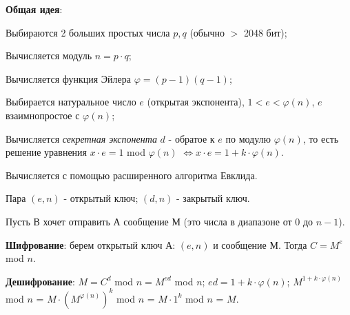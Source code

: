 \documentclass[../main.tex]{subfiles}
\begin{document}
    \textbf{Общая идея}:

    \void{} Выбираются 2 больших простых числа $p, q$ (обычно $>$ 2048 бит);

    \void{} Вычисляется модуль $n = p\cdot q$;

    \void{} Вычисляется функция Эйлера $\varphi = (p-1)(q-1)$;

    \void{} Выбирается натуральное число $e$ (открытая экспонента), $1 < e < \varphi(n)$,
    $e$ взаимнопростое с $\varphi(n)$;

    \void{} Вычисляется \textit{секретная экспонента} $d$ - обратое к $e$ по модулю $\varphi(n)$,
    то есть решение уравнения $x\cdot e = 1$ mod $\varphi(n)$ $\Longleftrightarrow x\cdot e = 1 + k\cdot\varphi(n)$.

    Вычисляется с помощью расширенного алгоритма Евклида.

    \void{} Пара $(e, n)$ - открытый ключ; $(d, n)$ - закрытый ключ.

    \void{}

    Пусть В хочет отправить А сообщение М (это числа в диапазоне от 0 до $n - 1$).

    \void\textbf{Шифрование}: берем открытый ключ А: $(e, n)$ и сообщение М. Тогда
    $C = M^e$ mod $n$.

    \void\textbf{Дешифрование}: $M = C^d$ mod $n = M^{ed}$ mod $n$; $ed = 1 + k\cdot\varphi(n)$;
    $M^{1 + k\cdot\varphi(n)}$ mod $n$ = $M\cdot (M^{\varphi(n)})^k$ mod $n$ =
    $M\cdot 1^k$ mod $n$ = $M$.
\end{document}
